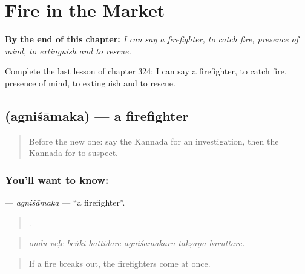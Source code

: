 
\chapter{Fire in the Market}
\label{ch:ka-fire-in-the-market}

\begin{chapteropening}
\textbf{By the end of this chapter:} \emph{I can say a firefighter, to catch fire, presence of mind, to extinguish and to rescue.}

Complete the last lesson of chapter 324: I can say a firefighter, to catch fire, presence of mind, to extinguish and to rescue.
\end{chapteropening}

\section[\texorpdfstring{\kn{ಅಗ್ನಿಶಾಮಕ} (agniśāmaka)}{ಅಗ್ನಿಶಾಮಕ (agniśāmaka)}]{ (agniśāmaka) — a firefighter}

\label{lesson:KA-C324-agnisamaka}



\begin{quote}
Before the new one: say the Kannada for an investigation, then the Kannada for to suspect.
\end{quote}

\subsection*{You'll want to know: }
\textbf{} — \emph{agniśāmaka} — \textquotedblleft{}a firefighter\textquotedblright{}.

\begin{quote}
      .
\end{quote}

\begin{quote}
\emph{ondu vēḷe beṅki hattidare agniśāmakaru takṣaṇa baruttāre.}
\end{quote}

\begin{quote}
If a fire breaks out, the firefighters come at once.
\end{quote}

